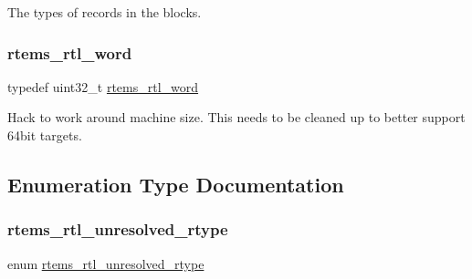The types of records in the blocks. \mbox{\label{rtl-unresolved_8h_a5ab1ca8c94e49686f84f5ccf0731f0e6}} 
\subsubsection{\texorpdfstring{rtems\_rtl\_word}{rtems\_rtl\_word}}
{\footnotesize\ttfamily typedef uint32\+\_\+t \mbox{\hyperlink{rtl-unresolved_8h_a5ab1ca8c94e49686f84f5ccf0731f0e6}{rtems\+\_\+rtl\+\_\+word}}}

Hack to work around machine size. This needs to be cleaned up to better support 64bit targets. 

\subsection{Enumeration Type Documentation}
\mbox{\label{rtl-unresolved_8h_a4c5be38f1158006e6bc839d4f060ecb6}} 
\subsubsection{\texorpdfstring{rtems\_rtl\_unresolved\_rtype}{rtems\_rtl\_unresolved\_rtype}}
{\footnotesize\ttfamily enum \mbox{\hyperlink{rtl-unresolved_8h_a4c5be38f1158006e6bc839d4f060ecb6}{rtems\+\_\+rtl\+\_\+unresolved\+\_\+rtype}}}


